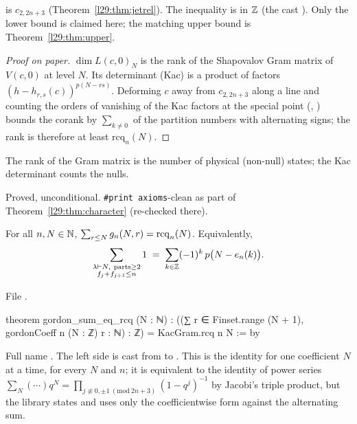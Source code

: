 \begin{dictionary}
 is $c_{2,2n+3}$ (Theorem~\ref{l29:thm:jetrel}). The inequality is in ${\mathbb{Z}}$ (the cast ).
Only the lower bound is claimed here; the matching upper bound is Theorem~\ref{l29:thm:upper}.
\end{dictionary}

\begin{proof}[Proof on paper]
$\dim L(c,0)_N$ is the rank of the Shapovalov Gram matrix of $V(c,0)$ at level $N$. Its determinant (Kac) is a product
of factors $(h-h_{r,s}(c))^{p(N-rs)}$. Deforming $c$ away from $c_{2,2n+3}$ along a line and counting the orders of
vanishing of the Kac factors at the special point (, ) bounds the corank by
$\sum_{k\ne0}$ of the partition numbers with alternating signs; the rank is therefore at least $\mathrm{rcq}_n(N)$.
\end{proof}

\begin{physics}
The rank of the Gram matrix is the number of physical (non-null) states; the Kac determinant counts the nulls.
\end{physics}

\begin{status}
Proved, unconditional. \texttt{\#print axioms}-clean as part of Theorem~\ref{l29:thm:character} (re-checked there).
\end{status}

\begin{theorem}\label{l29:thm:ag}
For all $n,N\in{\mathbb{N}}$, $\sum_{r\le N}g_n(N,r)=\mathrm{rcq}_n(N)$. Equivalently,
\begin{equation*}
\sum_{\substack{\lambda\vdash N,\ \text{parts}\ge2\\ f_j+f_{j+1}\le n}}1\;=\;\sum_{k\in\Z}(-1)^k\,p\bigl(N-e_n(k)\bigr).
\end{equation*}
\end{theorem}

\noindent File .
\begin{leancode}
theorem gordon_sum_eq_rcq (N : ℕ) :
    ((∑ r ∈ Finset.range (N + 1), gordonCoeff n (N : ℤ) r : ℕ) : ℤ) = KacGram.rcq n N := by
\end{leancode}

\begin{dictionary}
Full name . The left side is cast from  to . This is
the identity for one coefficient $N$ at a time, for every $N$ and $n$; it is equivalent to the identity of power
series $\sum_N(\cdots)q^N=\prod_{j\not\equiv0,\pm1\ (\mathrm{mod}\ 2n+3)}(1-q^j)^{-1}$ by Jacobi's triple product,
but the library states and uses only the coefficientwise form against the alternating sum.
\end{dictionary}

